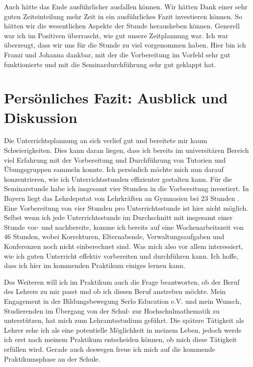 \documentclass[man,12pt,a4paper]{apa6}
\begin{document}
Auch hätte das Ende ausführlicher ausfallen können. Wir hätten Dank einer sehr guten Zeiteinteilung mehr Zeit in ein ausführliches Fazit investieren können. So hätten wir die wesentlichen Aspekte der Stunde herausheben können. Generell war ich im Positiven überrascht, wie gut unsere Zeitplannung war. Ich war überzeugt, dass wir uns für die Stunde zu viel vorgenommen haben. Hier bin ich Franzi und Johanna dankbar, mit der die Vorbereitung im Vorfeld sehr gut funktionierte und mit die Seminardurchführung sehr gut geklappt hat.

\section{Persönliches Fazit: Ausblick und Diskussion}

Die Unterrichtsplannung an sich verlief gut und bereitete mir kaum Schwierigkeiten. Dies kann daran liegen, dass ich bereits im universitären Bereich viel Erfahrung mit der Vorbereitung und Durchführung von Tutorien und Übungsgruppen sammeln konnte. Ich persönlich möchte mich nun darauf konzentrieren, wie ich Unterrichtsstunden effizienter gestalten kann. Für die Seminarstunde habe ich insgesamt vier Stunden in die Vorbereitung investiert. In Bayern liegt das Lehrdeputat von Lehrkräften an Gymnasien bei 23 Stunden \parencite{kmstunden}. Eine Vorbereitung von vier Stunden pro Unterrichtsstunde ist hier nicht möglich. Selbst wenn ich jede Unterrichtsstunde im Durchschnitt mit insgesamt einer Stunde vor- und nachbereite, komme ich bereits auf eine Wochenarbeitszeit von 46 Stunden, wobei Korrekturen, Elternabende, Verwaltungsaufgaben und Konferenzen noch nicht einberechnet sind. Was mich also vor allem interessiert, wie ich guten Unterricht effektiv vorbereiten und durchführen kann. Ich hoffe, dass ich hier im kommenden Praktikum einiges lernen kann.

Des Weiteren will ich im Praktikum auch die Frage beantworten, ob der Beruf des Lehrers zu mir passt und ob ich diesen Beruf anstreben möchte. Mein Engagement in der Bildungsbewegung Serlo Education e.V. und mein Wunsch, Studierenden im Übergang von der Schul- zur Hochschulmathematik zu unterstützen, hat mich zum Lehramtsstudium geführt. Die spätere Tätigkeit als Lehrer sehe ich als eine potentielle Möglichkeit in meinem Leben, jedoch werde ich erst nach meinem Praktikum entscheiden können, ob mich diese Tätigkeit erfüllen wird. Gerade auch deswegen freue ich mich auf die kommende Praktikumsphase an der Schule.

\printbibliography


\end{document}
